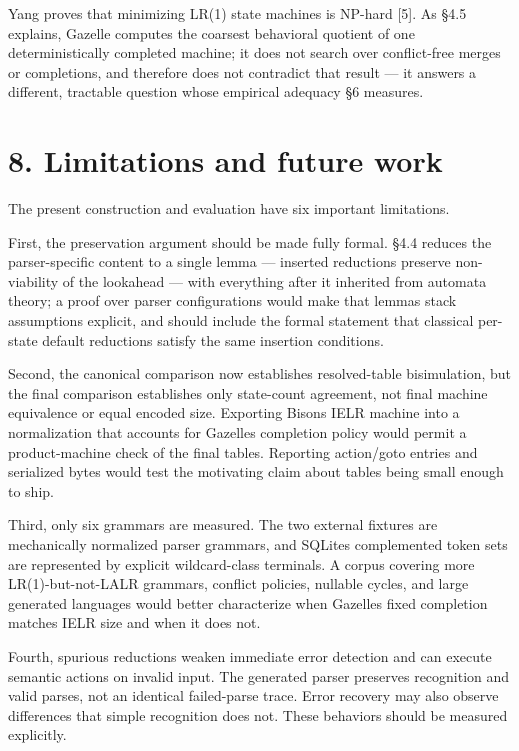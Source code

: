 \documentclass[
  10pt,
]{article}
\begin{document}
Yang proves that minimizing LR(1) state machines is NP-hard {[}5{]}. As
§4.5 explains, Gazelle computes the coarsest behavioral quotient of one
deterministically completed machine; it does not search over
conflict-free merges or completions, and therefore does not contradict
that result --- it answers a different, tractable question whose
empirical adequacy §6 measures.

\hypertarget{8-limitations-and-future-work}{%
\section{8. Limitations and future
work}\label{8-limitations-and-future-work}}

The present construction and evaluation have six important limitations.

First, the preservation argument should be made fully formal. §4.4
reduces the parser-specific content to a single lemma --- inserted
reductions preserve non-viability of the lookahead --- with everything
after it inherited from automata theory; a proof over parser
configurations would make that lemma\textquotesingle s stack assumptions
explicit, and should include the formal statement that classical
per-state default reductions satisfy the same insertion conditions.

Second, the canonical comparison now establishes resolved-table
bisimulation, but the final comparison establishes only state-count
agreement, not final machine equivalence or equal encoded size.
Exporting Bison\textquotesingle s IELR machine into a normalization that
accounts for Gazelle\textquotesingle s completion policy would permit a
product-machine check of the final tables. Reporting action/goto entries
and serialized bytes would test the motivating claim about tables being
small enough to ship.

Third, only six grammars are measured. The two external fixtures are
mechanically normalized parser grammars, and SQLite\textquotesingle s
complemented token sets are represented by explicit wildcard-class
terminals. A corpus covering more LR(1)-but-not-LALR grammars, conflict
policies, nullable cycles, and large generated languages would better
characterize when Gazelle\textquotesingle s fixed completion matches
IELR size and when it does not.

Fourth, spurious reductions weaken immediate error detection and can
execute semantic actions on invalid input. The generated parser
preserves recognition and valid parses, not an identical failed-parse
trace. Error recovery may also observe differences that simple
recognition does not. These behaviors should be measured explicitly.
\end{document}
